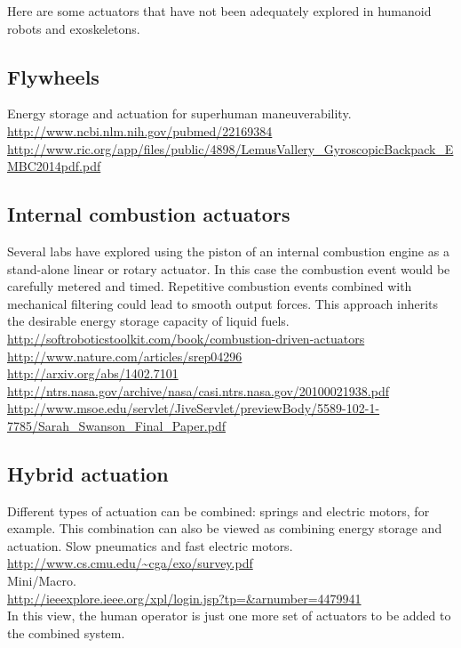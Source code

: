 \documentclass[letterpaper,12pt,fullpage]{article}
\begin{document}
Here are some actuators
that have not been adequately explored
in humanoid robots and exoskeletons.

\subsection{Flywheels}

Energy storage and actuation for superhuman maneuverability.\\
\url{http://www.ncbi.nlm.nih.gov/pubmed/22169384}\\
\url{http://www.ric.org/app/files/public/4898/LemusVallery_GyroscopicBackpack_EMBC2014pdf.pdf}


\subsection{Internal combustion actuators}

Several labs have explored using the piston of an internal combustion
engine as a stand-alone linear or rotary actuator. In this case
the combustion event would be carefully metered and timed. Repetitive
combustion events combined with mechanical filtering could lead to smooth
output forces. This approach inherits the desirable energy storage capacity
of liquid fuels.\\ 
\url{http://softroboticstoolkit.com/book/combustion-driven-actuators}\\
\url{http://www.nature.com/articles/srep04296}\\
\url{http://arxiv.org/abs/1402.7101}\\
\url{http://ntrs.nasa.gov/archive/nasa/casi.ntrs.nasa.gov/20100021938.pdf}\\
\url{http://www.msoe.edu/servlet/JiveServlet/previewBody/5589-102-1-7785/Sarah_Swanson_Final_Paper.pdf}

\subsection{Hybrid actuation}

Different types of actuation can be combined: springs and electric motors,
for example. This combination can also be viewed as combining energy
storage and actuation. Slow pneumatics and fast electric motors.\\
\url{http://www.cs.cmu.edu/~cga/exo/survey.pdf}\\
Mini/Macro.\\
\url{http://ieeexplore.ieee.org/xpl/login.jsp?tp=&arnumber=4479941}\\
In this view, the human operator is just
one more set of actuators to be added to the combined system.
\end{document}
